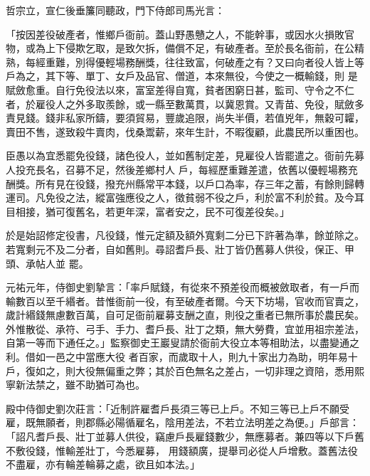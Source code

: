\begin{pinyinscope}
 哲宗立，宣仁後垂簾同聽政，門下侍郎司馬光言：



 「按因差役破產者，惟鄉戶衙前。蓋山野愚戇之人，不能幹事，或因水火損敗官物，或為上下侵欺乞取，是致欠拆，備償不足，有破產者。至於長名衙前，在公精熟，每經重難，別得優輕場務酬獎，往往致富，何破產之有？又曰向者役人皆上等戶為之，其下等、單丁、女戶及品官、僧道，本來無役，今使之一概輸錢，則
 是賦斂愈重。自行免役法以來，富室差得自寬，貧者困窮日甚，監司、守令之不仁者，於雇役人之外多取羨餘，或一縣至數萬貫，以冀恩賞。又青苗、免役，賦斂多責見錢。錢非私家所鑄，要須貿易，豐歲追限，尚失半價，若值兇年，無穀可糶，賣田不售，遂致殺牛賣肉，伐桑鬻薪，來年生計，不暇復顧，此農民所以重困也。



 臣愚以為宜悉罷免役錢，諸色役人，並如舊制定差，見雇役人皆罷遣之。衙前先募人投充長名，召募不足，然後差鄉村人
 戶，每經歷重難差遣，依舊以優輕場務充酬獎。所有見在役錢，撥充州縣常平本錢，以戶口為率，存三年之蓄，有餘則歸轉運司。凡免役之法，縱富強應役之人，徵貧弱不役之戶，利於富不利於貧。及今耳目相接，猶可復舊名，若更年深，富者安之，民不可復差役矣。」



 於是始詔修定役書，凡役錢，惟元定額及額外寬剩二分已下許著為準，餘並除之。若寬剩元不及二分者，自如舊則。尋詔耆戶長、壯丁皆仍舊募人供役，保正、甲頭、承帖人並
 罷。



 元祐元年，侍御史劉摯言：「率戶賦錢，有從來不預差役而概被斂取者，有一戶而輸數百以至千緡者。昔惟衙前一役，有至破產者爾。今天下坊場，官收而官賣之，歲計緡錢無慮數百萬，自可足衙前雇募支酬之直，則役之重者已無所事於農民矣。外惟散從、承符、弓手、手力、耆戶長、壯丁之類，無大勞費，宜並用祖宗差法，自第一等而下通任之。」監察御史王巖叟請於衙前大役立本等相助法，以盡變通之利。借如一邑之中當應大役
 者百家，而歲取十人，則九十家出力為助，明年易十戶，復如之，則大役無偏重之弊；其於百色無名之差占，一切非理之資陪，悉用熙寧新法禁之，雖不助猶可為也。



 殿中侍御史劉次莊言：「近制許雇耆戶長須三等已上戶。不知三等已上戶不願受雇，既無願者，則郡縣必陽循雇名，陰用差法，不若立法明差之為便。」戶部言：「詔凡耆戶長、壯丁並募人供役，竊慮戶長雇錢數少，無應募者。兼四等以下戶舊不敷役錢，惟輸差壯丁，今悉雇募，
 用錢額廣，提舉司必從人戶增敷。蓋舊法役不盡雇，亦有輪差輪募之處，欲且如本法。」




\end{pinyinscope}
